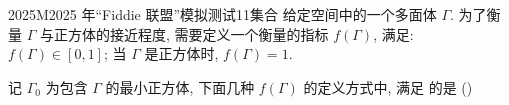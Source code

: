 
\begin{problem}{2025}{M}{2025 年“Fiddie 联盟”模拟测试}{11}{集合}
给定空间中的一个多面体 $\Gamma$. 为了衡量 $\Gamma$ 与正方体的接近程度, 需要定义一个衡量的指标 $f(\Gamma)$, 满足:  $f(\Gamma)\in [0,1]$;  当 $\Gamma$ 是正方体时, $f(\Gamma)=1$.

记 $\Gamma_0$ 为包含 $\Gamma$ 的最小正方体, 下面几种 $f(\Gamma)$ 的定义方式中, 满足  的是 (\hspace{1cm})
\begin{choices}
\end{choices}
\end{problem}